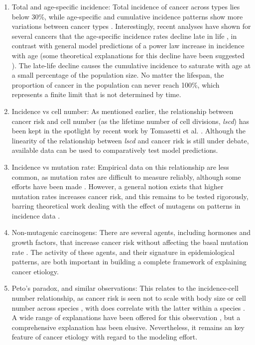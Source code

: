 \documentclass[10pt,twocolumn,twoside]{article}
\begin{document}
\begin{enumerate}
	\item Total and age-specific incidence: Total incidence of cancer across types lies below 30\%, while age-specific and cumulative incidence patterns show more variations between cancer types \cite{AmericanCancerSociety2016}. Interestingly, recent analyses have shown for several cancers that the age-specific incidence rates decline late in life \cite{Harding2012}, in contrast with general model predictions of a power law increase in incidence with age (some theoretical explanations for this decline have been suggested \cite{Frank2007}). The late-life decline causes the cumulative incidence to saturate with age at a small percentage of the population size. No matter the lifespan, the proportion of cancer in the population can never reach 100\%, which represents a finite limit that is not determined by time.
	\item Incidence vs cell number: As mentioned earlier, the relationship between cancer risk and cell number (as the lifetime number of cell divisions, \textit{lscd}) has been kept in the spotlight by recent work by Tomasetti et al. \cite{Tomasetti78, Tomasetti2017}. Although the linearity of the relationship between \textit{lscd} and cancer risk is still under debate, available data can be used to comparatively test model predictions.
	\item Incidence vs mutation rate: Empirical data on this relationship are less common, as mutation rates are difficult to measure reliably, although some efforts have been made \cite{Hao2016}. However, a general notion exists that higher mutation rates increases cancer risk, and this remains to be tested rigorously, barring theoretical work dealing with the effect of mutagens on patterns in incidence data \cite{Frank2007}.
	\item Non-mutagenic carcinogens: There are several agents, including hormones and growth factors, that increase cancer risk without affecting the basal mutation rate \cite{Tennant1993}. The activity of these agents, and their signature in epidemiological patterns, are both important in building a complete framework of explaining cancer etiology.
	\item Peto's paradox, and similar observations: This relates to the incidence-cell number relationship, as cancer risk is seen not to scale with body size or cell number across species \cite{Nagy2007}, with does correlate with the latter within a species \cite{Noble2015}. A wide range of explanations have been offered for this observation \cite{Tollis2017b}, but a comprehensive explanation has been elusive. Nevertheless, it remains an key feature of cancer etiology with regard to the modeling effort.
\end{enumerate}
\end{document}
